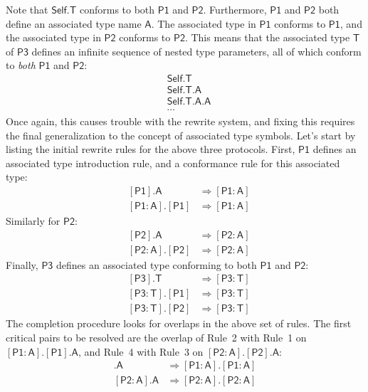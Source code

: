 \documentclass[headsepline,bibliography=totoc]{scrreport}
\newcommand{\namesym}[1]{\mathsf{#1}}
\newcommand{\genericparam}[1]{\bm{\mathsf{#1}}}
\newcommand{\proto}[1]{\bm{\mathsf{#1}}}
\newcommand{\protosym}[1]{[\proto{#1}]}
\newcommand{\assocsym}[2]{[\proto{#1}\colon\namesym{#2}]}
\theoremstyle{definition}
\theoremstyle{definition}
\theoremstyle{definition}
\begin{document}
Note that $\genericparam{Self}.\namesym{T}$ conforms to both $\proto{P1}$ and $\proto{P2}$. Furthermore, $\proto{P1}$ and $\proto{P2}$ both define an associated type name $\namesym{A}$. The associated type in $\proto{P1}$ conforms to $\proto{P1}$, and the associated type in $\proto{P2}$ conforms to $\proto{P2}$. This means that the associated type $\namesym{T}$ of $\proto{P3}$ defines an infinite sequence of nested type parameters, all of which conform to \emph{both} $\proto{P1}$ and $\proto{P2}$:
\begin{align*}
&\genericparam{Self}.\namesym{T}\\
&\genericparam{Self}.\namesym{T}.\namesym{A}\\
&\genericparam{Self}.\namesym{T}.\namesym{A}.\namesym{A}\\
&\cdots
\end{align*}
Once again, this causes trouble with the rewrite system, and fixing this requires the final generalization to the concept of associated type symbols. Let's start by listing the initial rewrite rules for the above three protocols. First, $\proto{P1}$ defines an associated type introduction rule, and a conformance rule for this associated type:
\begin{align}
&\protosym{P1}.\namesym{A}&\Rightarrow\assocsym{P1}{A}\tag{1}\\
&\assocsym{P1}{A}.\protosym{P1}&\Rightarrow\assocsym{P1}{A}\tag{2}
\end{align}
Similarly for $\proto{P2}$:
\begin{align}
&\protosym{P2}.\namesym{A}&\Rightarrow\assocsym{P2}{A}\tag{3}\\
&\assocsym{P2}{A}.\protosym{P2}&\Rightarrow\assocsym{P2}{A}\tag{4}
\end{align}
Finally, $\proto{P3}$ defines an associated type conforming to both $\proto{P1}$ and $\proto{P2}$:
\begin{align}
&\protosym{P3}.\namesym{T}&\Rightarrow\assocsym{P3}{T}\tag{5}\\
&\assocsym{P3}{T}.\protosym{P1}&\Rightarrow\assocsym{P3}{T}\tag{6}\\
&\assocsym{P3}{T}.\protosym{P2}&\Rightarrow\assocsym{P3}{T}\tag{7}
\end{align}
The completion procedure looks for overlaps in the above set of rules. The first critical pairs to be resolved are the overlap of Rule~2 with Rule~1 on $\assocsym{P1}{A}.\protosym{P1}.\namesym{A}$, and Rule~4 with Rule~3 on $\assocsym{P2}{A}.\protosym{P2}.\namesym{A}$:
\begin{align}
\assocsym{P1}{A}.\namesym{A}&\Rightarrow\assocsym{P1}{A}.\assocsym{P1}{A}\tag{8}\\
\assocsym{P2}{A}.\namesym{A}&\Rightarrow\assocsym{P2}{A}.\assocsym{P2}{A}\tag{9}
\end{align}
\end{document}
